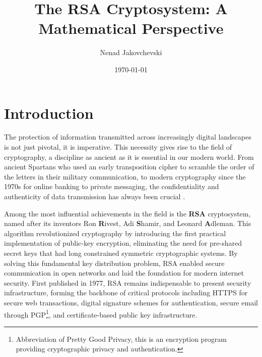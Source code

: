 \documentclass[11pt,a4paper]{article}
\title{\textbf{The RSA Cryptosystem: A Mathematical Perspective}}
\author{Nenad Jakovchevski}
\date{\today}
\numberwithin{equation}{section}
\begin{document}

\maketitle

\thispagestyle{empty}

\vspace{1cm}

\tableofcontents

\vspace{1cm}

\listoffigures

\newpage

\pagestyle{plain}
\section{Introduction}
\hspace{0.5cm} The protection of information transmitted across increasingly digital landscapes is not just pivotal, it is imperative. This necessity gives rise to the field of cryptography, a discipline as ancient as it is essential in our modern world. From ancient Spartans who used an early transposition cipher to scramble the order of the letters in their military communication, to modern cryptography since the 1970s for online banking to private messaging, the confidentiality and authenticity of data transmission has always been crucial \cite{dasGold}.

Among the most influential achievements in the field is the \textbf{RSA} cryptosystem, named after its inventors Ron \textbf{R}ivest, Adi \textbf{S}hamir, and Leonard \textbf{A}dleman. This algorithm revolutionized cryptography by introducing the first practical implementation of public-key encryption, eliminating the need for pre-shared secret keys that had long constrained symmetric cryptographic systems. By solving this fundamental key distribution problem, RSA enabled secure communication in open networks and laid the foundation for modern internet security. First published in 1977, RSA remains indispensable to present security infrastructure, forming the backbone of critical protocols including HTTPS for secure web transactions, digital signature schemes for authentication, secure email through PGP\footnote{Abbreviation of Pretty Good Privacy, this is an encryption program providing cryptographic privacy and authentication.}, and certificate-based public key infrastructure.
\end{document}
